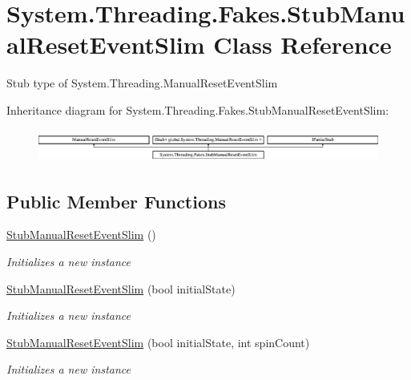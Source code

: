 \hypertarget{class_system_1_1_threading_1_1_fakes_1_1_stub_manual_reset_event_slim}{\section{System.\-Threading.\-Fakes.\-Stub\-Manual\-Reset\-Event\-Slim Class Reference}
\label{class_system_1_1_threading_1_1_fakes_1_1_stub_manual_reset_event_slim}
}


Stub type of System.\-Threading.\-Manual\-Reset\-Event\-Slim 


Inheritance diagram for System.\-Threading.\-Fakes.\-Stub\-Manual\-Reset\-Event\-Slim\-:\begin{figure}[H]
\begin{center}
\leavevmode
\includegraphics[height=1.088435cm]{class_system_1_1_threading_1_1_fakes_1_1_stub_manual_reset_event_slim}
\end{center}
\end{figure}
\subsection*{Public Member Functions}
\begin{DoxyCompactItemize}
\item 
\hyperlink{class_system_1_1_threading_1_1_fakes_1_1_stub_manual_reset_event_slim_ac310567834a31a111e6cffaaa3483ad3}{Stub\-Manual\-Reset\-Event\-Slim} ()
\begin{DoxyCompactList}\small\item\em Initializes a new instance\end{DoxyCompactList}\item 
\hyperlink{class_system_1_1_threading_1_1_fakes_1_1_stub_manual_reset_event_slim_a57ed039136e029255522786da2bfc941}{Stub\-Manual\-Reset\-Event\-Slim} (bool initial\-State)
\begin{DoxyCompactList}\small\item\em Initializes a new instance\end{DoxyCompactList}\item 
\hyperlink{class_system_1_1_threading_1_1_fakes_1_1_stub_manual_reset_event_slim_aa212357d13e4a2e649766c0a6306c0f3}{Stub\-Manual\-Reset\-Event\-Slim} (bool initial\-State, int spin\-Count)
\begin{DoxyCompactList}\small\item\em Initializes a new instance\end{DoxyCompactList}\end{DoxyCompactItemize}
